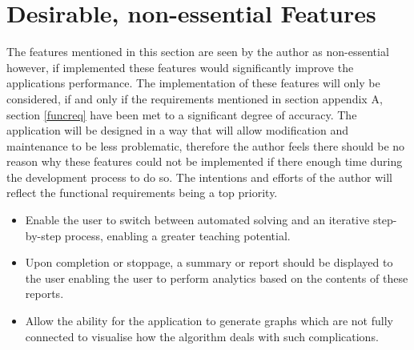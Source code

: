 \section{Desirable, non-essential Features}

The features mentioned in this section are seen by the author as non-essential however, if implemented these features would significantly improve the applications performance. The implementation of these features will only be considered, if and only if the requirements mentioned in section appendix A, section \ref{funcreq} have been met to a significant degree of accuracy. The application will be designed in a way that will allow modification and maintenance to be less problematic, therefore the author feels there should be no reason why these features could not be implemented if there enough time during the development process to do so. The intentions and efforts of the author will reflect the functional requirements being a top priority.

\begin{itemize}
\item Enable the user to switch between automated solving and an iterative step-by-step process, enabling a greater teaching potential.
\item Upon completion or stoppage, a summary or report should be displayed to the user enabling the user to perform analytics based on the contents of these reports.
\item Allow the ability for the application to generate graphs which are not fully connected to visualise how the algorithm deals with such complications.
\end{itemize}
